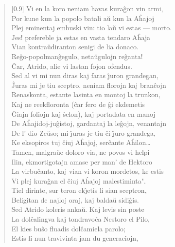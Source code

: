 \begin{verse}[0.9\textwidth]
          Vi en la koro neniam havas kura\^gon vin armi,\\
          Por kune kun la popolo batali a\u u kun la A\^hajoj\\
          Plej eminentaj embuski vin: tio la\u u vi estas --- morto.\\
          Jes! prefereble ja estas en vasta tendaro A\^haja\\
          Vian kontra\u udiranton senigi de lia donaco.\\
          Re\^go-popolman\^gegulo, neta\u ugulojn re\^ganta!\\
          \^Car, Atrido, alie vi lastan fojon ofendus.\\
          Sed al vi mi nun diras kaj faras \^{\j}uron grandegan,\\
          \^Juras mi je tiu sceptro, neniam florojn kaj bran\^cojn\\
          Renaskonta, estante lasinta en montoj la trunkon,\\
          Kaj ne reekfloronta (\^car fero de \^gi ekdemetis\\
          \^Giajn foliojn kaj \^selon), kaj portadata en manoj\\
          De A\^hajidoj-ju\^gistoj, gardantaj la le\^gojn, venantajn\\
          De l' dio Ze\u uso; mi \^{\j}uras je tiu \^ci \^{\j}uro grandega,\\
          Ke eksopiros tuj \^ciuj A\^hajoj, ser\^cante A\^hilon\dots\\
          Tamen, malgra\u ue doloro via, ne povos vi helpi\\
          Ilin, ekmortigotajn amase per man' de Hektoro\\
          La virbu\^canto, kaj vian vi koron mordetos, ke estis\\
          Vi plej kura\^gan el \^ciuj A\^hajoj malestiminta".\\
          \vin   Tiel dirinte, sur teron ek\^{\j}etis li sian sceptron,\\
          Beligitan de najloj oraj, kaj balda\u u sidi\^gis.\\
          Sed Atrido koleris anka\u u. Kaj levis sin poste\\
          La dol\^calingva kaj tondravo\^ca Nestoro el Pilo,\\
          El kies bu\^so fluadis dol\^camiela parolo;\\
          Estis li nun travivinta jam du generaciojn,\\

\end{verse}
